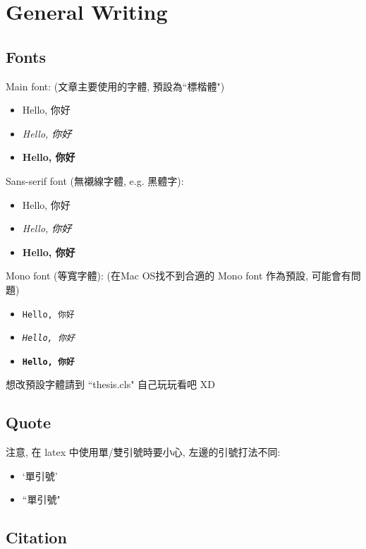 \chapter{General Writing}
\label{chpater:writing}

\section{Fonts}

Main font: (文章主要使用的字體, 預設為``標楷體")
\begin{itemize}
\item Hello, 你好
\item \textit{Hello, 你好} 
\item \textbf{Hello, 你好}
\end{itemize}

Sans-serif font (無襯線字體, e.g. 黑體字):
\begin{itemize}
\item \textsf{Hello, 你好}
\item \textsf{\textit{Hello, 你好}}
\item \textsf{\textbf{Hello, 你好}}
\end{itemize}

Mono font (等寬字體):
(在Mac OS找不到合適的 Mono font 作為預設, 可能會有問題)
\begin{itemize}
\item \texttt{Hello, 你好}
\item \texttt{\textit{Hello, 你好}}  %
\item \texttt{\textbf{Hello, 你好}}  %
\end{itemize}

想改預設字體請到 ``thesis.cls" 自己玩玩看吧 XD


\section{Quote}

注意, 在 latex 中使用單/雙引號時要小心, 左邊的引號打法不同:
\begin{itemize}
\item `單引號'
\item ``單引號"
\end{itemize}


\section{Citation}
\label{sec:citation}


